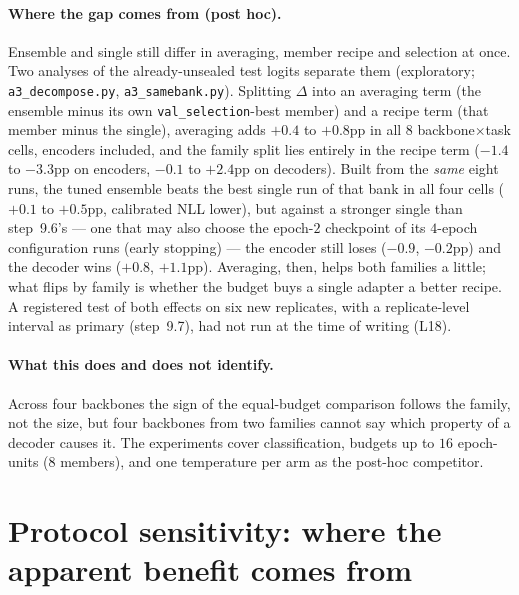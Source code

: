 \documentclass[11pt]{article}
\begin{document}
\paragraph{Where the gap comes from (post hoc).} Ensemble and single still differ in averaging, member recipe and selection at once. Two analyses of the already-unsealed test logits separate them (exploratory; \texttt{a3\_\allowbreak decompose.\allowbreak py}, \texttt{a3\_\allowbreak samebank.\allowbreak py}). Splitting $\Delta$ into an averaging term (the ensemble minus its own \texttt{val\_selection}-best member) and a recipe term (that member minus the single), averaging adds $+0.4$ to $+0.8$pp in all $8$ backbone$\times$task cells, encoders included, and the family split lies entirely in the recipe term ($-1.4$ to $-3.3$pp on encoders, $-0.1$ to $+2.4$pp on decoders). Built from the \emph{same} eight runs, the tuned ensemble beats the best single run of that bank in all four cells ($+0.1$ to $+0.5$pp, calibrated NLL lower), but against a stronger single than step~9.6's --- one that may also choose the epoch-$2$ checkpoint of its $4$-epoch configuration runs (early stopping) --- the encoder still loses ($-0.9$, $-0.2$pp) and the decoder wins ($+0.8$, $+1.1$pp). Averaging, then, helps both families a little; what flips by family is whether the budget buys a single adapter a better recipe. A registered test of both effects on six new replicates, with a replicate-level interval as primary (step~9.7), had not run at the time of writing (L18).

\paragraph{What this does and does not identify.} Across four backbones the sign of the equal-budget comparison follows the family, not the size, but four backbones from two families cannot say which property of a decoder causes it. The experiments cover classification, budgets up to $16$ epoch-units ($8$ members), and one temperature per arm as the post-hoc competitor.

\section{Protocol sensitivity: where the apparent benefit comes from}\label{sec:protocol}
\end{document}
